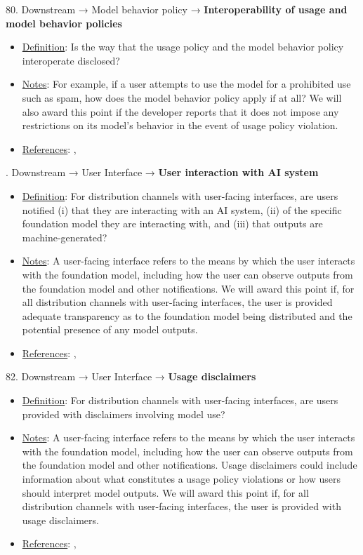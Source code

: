 80. Downstream → Model behavior policy → \textbf{Interoperability of usage and model behavior policies}
\vspace{-\parskip}
\begin{itemize}
\item
\underline{Definition}: Is the way that the usage policy and the model behavior policy interoperate disclosed?
\item
\underline{Notes}: For example, if a user attempts to use the model for a prohibited use such as spam, how does the model behavior policy apply if at all? We will also award this point if the developer reports that it does not impose any restrictions on its model's behavior in the event of usage policy violation.
\item
\underline{References}: \citet{reuter2023im}, \citet{qi2023finetuning}
\end{itemize}


. Downstream → User Interface → \textbf{User interaction with AI system}
\vspace{-\parskip}
\begin{itemize}
\item
\underline{Definition}: For distribution channels with user-facing interfaces, are users notified (i) that they are interacting with an AI system, (ii) of the specific foundation model they are interacting with, and (iii) that outputs are machine-generated?
\item
\underline{Notes}: A user-facing interface refers to the means by which the user interacts with the foundation model, including how the user can observe outputs from the foundation model and other notifications. We will award this point if, for all distribution channels with user-facing interfaces, the user is provided adequate transparency as to the foundation model being distributed and the potential presence of any model outputs.
\item
\underline{References}: \citet{qiaosi2023ux}, \citet{nakao2022responsible}
\end{itemize}


82. Downstream → User Interface → \textbf{Usage disclaimers}
\vspace{-\parskip}
\begin{itemize}
\item
\underline{Definition}: For distribution channels with user-facing interfaces, are users provided with disclaimers involving model use?
\item
\underline{Notes}: A user-facing interface refers to the means by which the user interacts with the foundation model, including how the user can observe outputs from the foundation model and other notifications. Usage disclaimers could include information about what constitutes a usage policy violations or how users should interpret model outputs. We will award this point if, for all distribution channels with user-facing interfaces, the user is provided with usage disclaimers.
\item
\underline{References}: \citet{qiaosi2023ux}, \citet{nakao2022responsible}
\end{itemize}


